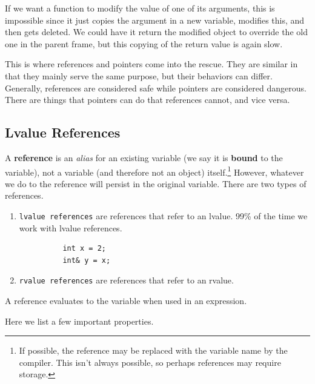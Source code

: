 \documentclass{article}
\newcounter{definition}[section]
\newcounter{example}[section]
\begin{document}
    \begin{example}
      \label{ex:in-place-modification}
      If we want a function to modify the value of one of its arguments, this is impossible since it just copies the argument in a new variable, modifies this, and then gets deleted. We could have it return the modified object to override the old one in the parent frame, but this copying of the return value is again slow.   
    \end{example}

    This is where references and pointers come into the rescue. They are similar in that they mainly serve the same purpose, but their behaviors can differ. Generally, references are considered safe while pointers are considered dangerous. There are things that pointers can do that references cannot, and vice versa. 

  \subsection{Lvalue References}
  
    \begin{definition}
      \label{def:lvalue-reference}
      A \textbf{reference} is an \textit{alias} for an existing variable (we say it is \textbf{bound} to the variable), not a variable (and therefore not an object) itself.\footnote{If possible, the reference may be replaced with the variable name by the compiler. This isn't always possible, so perhaps references may require storage.} However, whatever we do to the reference will persist in the original variable. There are two types of references. 
      \begin{enumerate}
        \item \texttt{lvalue references} are references that refer to an lvalue. 99\% of the time we work with lvalue references. 
        \begin{lstlisting}
          int x = 2; 
          int& y = x; 
        \end{lstlisting}

        \item \texttt{rvalue references} are references that refer to an rvalue. 
      \end{enumerate} 
      A reference evaluates to the variable when used in an expression. 
    \end{definition}

    Here we list a few important properties. 
\end{document}
